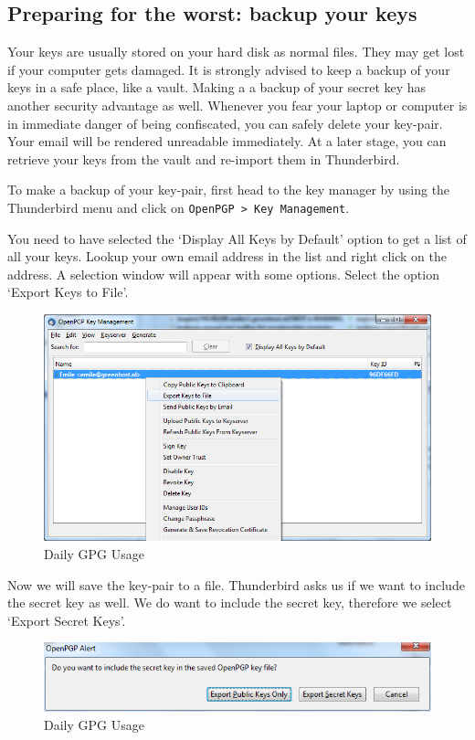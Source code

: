\subsection{Preparing for the worst: backup your keys}

Your keys are usually stored on your hard disk as normal files. They may
get lost if your computer gets damaged. It is strongly advised to keep a
backup of your keys in a safe place, like a vault. Making a a backup of
your secret key has another security advantage as well. Whenever you
fear your laptop or computer is in immediate danger of being
confiscated, you can safely delete your key-pair. Your email will be
rendered unreadable immediately. At a later stage, you can retrieve your
keys from the vault and re-import them in Thunderbird.

To make a backup of your key-pair, first head to the key manager by
using the Thunderbird menu and click on \verb!OpenPGP > Key Management!.

You need to have selected the `Display All Keys by Default' option to
get a list of all your keys. Lookup your own email address in the list
and right click on the address. A selection window will appear with some
options. Select the option `Export Keys to File'.

\begin{figure}[htbp]
\centering
\includegraphics{daily_gpg_36.png}
\caption{Daily GPG Usage}
\end{figure}

Now we will save the key-pair to a file. Thunderbird asks us if we want
to include the secret key as well. We do want to include the secret key,
therefore we select `Export Secret Keys'.

\begin{figure}[htbp]
\centering
\includegraphics{daily_gpg_37.png}
\caption{Daily GPG Usage}
\end{figure}

